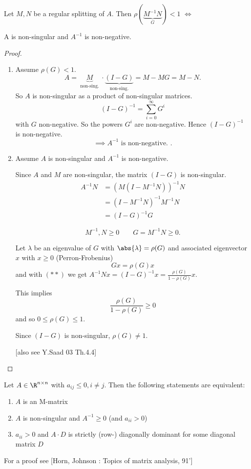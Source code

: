 \begin{theorem}
\label{thm:regularsplittingtheorem}
Let $M,N$ be a regular splitting of $A$. Then $\rho(\underbrace{M^{-1}N}_{G} ) < 1$ $\iff$

A is non-singular and $A^{-1}$ is non-negative.
\end{theorem}

\begin{proof}
\label{thm:regularsplittingtheoremproof}
\begin{enumerate}[label=\arabic{enumi})]
	\item Assume $\rho(G) < 1$. 
		\[
			A = \underbrace{M}_{\text{ non-sing. }}\cdot \underbrace{(I-G)}_{\text{ non-sing. }} = M -MG = M-N
		.\] 
		So $A$ is non-singular as a product of non-singular matrices.
		\[
			(I-G)^{-1} = \sum_{i=0}^{\infty}{G^{i}}
		\] 
		with $G$ non-negative. So the powers $G^{i}$ are non-negative. Hence $(I-G)^{-1}$ is non-negative.
		\[
		\implies A^{-1} \text{ is non-negative. }
		.\] 
	\item Assume $A$ is non-singular and $A^{-1}$ is non-negative.

		Since $A$ and $M$ are non-singular, the matrix $(I-G)$ is non-singular.
		\begin{align*}
			A^{-1}N &= (M(I-M^{-1}N))^{-1}N \\
					&= (I-M^{-1}N)^{-1}M^{-1}N \\
					\tag{$\ast\ast$}
					&= (I-G)^{-1}G
		\end{align*}

		\[
		M^{-1}, N \geq 0 \qquad G = M^{-1}N \geq 0
		.\] 

		Let $\lambda $ be an eigenvalue of $G$ with $\abs{\lambda }=\rho(G)$ and associated eigenvector $x$ with $x \geq 0$ (Perron-Frobenius)
		\[
			Gx = \rho(G)x
		\] 
		and with $(\ast\ast)$ we get $A^{-1}Nx = (I-G)^{-1}x = \frac{\rho(G)}{1 - \rho(G)}x$.

		This implies
		\[
			\frac{\rho(G)}{1-\rho(G)} \geq 0
		\] 
		and so $0 \leq \rho(G) \leq 1$.

		Since $(I-G)$ is non-singular, $\rho(G) \neq 1$.

		[also see Y.Saad 03 Th.4.4]
\end{enumerate}
\end{proof}

\begin{lemma}
\label{thm:matrixequivalences}
	Let $A \in \R^{n \times n}$ with $a_{ij} \leq 0, i \neq j$. Then the following statements are equivalent:
	\begin{enumerate}[label=\arabic{enumi})]
		\item $A$ is an M-matrix
		\item $A$ is non-singular and $A^{-1} \geq 0$ (and $a_{ii} > 0$)
		\item $a_{ii} > 0$ and $A\cdot D$ is strictly (row-) diagonally dominant for some diagonal matrix $D$
	\end{enumerate}
	
	For a proof see [Horn, Johnson : Topics of matrix analysis, 91']
\end{lemma}

